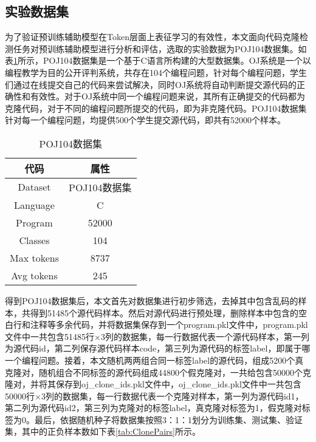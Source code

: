 \subsection{实验数据集}
\label{subsec:Dataset}
为了验证预训练辅助模型在Token层面上表征学习的有效性，本文面向代码克隆检测任务对预训练辅助模型进行分析和评估，选取的实验数据为POJ104数据集。如表\ref{tab：dataset}所示，POJ104数据集是一个基于C语言所构建的大型数据集。OJ系统是一个以编程教学为目的公开评判系统，共存在104个编程问题，针对每个编程问题，学生们通过在线提交自己的代码来尝试解决，同时OJ系统将自动判断提交源代码的正确性和有效性。对于OJ系统中同一个编程问题来说，其所有正确提交的代码都为克隆代码，对于不同的编程问题所提交的代码，即为非克隆代码。POJ104数据集针对每一个编程问题，均提供500个学生提交源代码，即共有52000个样本。

\begin{table}[H]
  \centering
  \caption{POJ104数据集} 
  \label{tab：dataset}
  \begin{tabular*}{0.6\textwidth}{@{\extracolsep{\fill}}cc}
  \toprule
    代码			&属性		\\
  \midrule
    Dataset			&POJ104数据集 \\
    Language    &C \\
    Program			&52000 \\
    Classes			&104 \\
    Max tokens			&8737 \\
    Avg tokens			&245 \\
  \bottomrule
  \end{tabular*}
\end{table}

得到POJ104数据集后，本文首先对数据集进行初步筛选，去掉其中包含乱码的样本，共得到51485个源代码样本。然后对源代码进行预处理，删除样本中包含的空白行和注释等多余代码，并将数据集保存到一个program.pkl文件中，program.pkl文件中一共包含51485行×3列的数据集，每一行数据代表一个源代码样本，第一列为源代码id，第二列保存源代码样本code，第三列为源代码的标签label，即属于哪一个编程问题。接着，本文随机两两组合同一标签label的源代码，组成5200个真克隆对，随机组合不同标签的源代码组成44800个假克隆对，一共给包含50000个克隆对，并将其保存到oj\_clone\_ids.pkl文件中，oj\_clone\_ids.pkl文件中一共包含50000行×3列的数据集，每一行数据代表一个克隆对样本，第一列为源代码id1，第二列为源代码id2，第三列为克隆对的标签label，真克隆对标签为1，假克隆对标签为0。最后，依据随机种子将数据集按照3：1：1划分为训练集、测试集、验证集，其中的正负样本数如下表\ref{tab:ClonePairs}所示。

